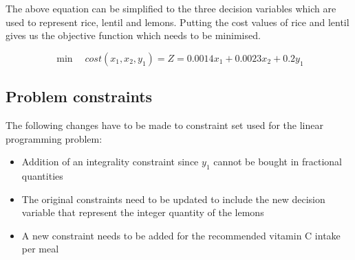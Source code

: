 \documentclass[
]{article}
\begin{document}
The above equation can be simplified to the three decision variables which are used to represent rice, lentil and lemons. 
Putting the cost values of rice and lentil gives us the objective function which needs to be minimised.

\begin{equation}
	\min \quad cost(x_1, x_2, y_1) = Z = 0.0014x_1 + 0.0023x_2 + 0.2y_1
\end{equation}

\hypertarget{problem-constraints-1}{%
	\subsection{Problem constraints}\label{problem-constraints-1}}

The following changes have to be made to constraint set used for the linear programming problem:
\begin{itemize}
	\item Addition of an integrality constraint since \(y_1\) cannot be bought in fractional quantities
	\item The original constraints need to be updated to include the new decision variable that represent the integer quantity of the lemons
	\item A new constraint needs to be added for the recommended vitamin C intake per meal
\end{itemize}
\end{document}
